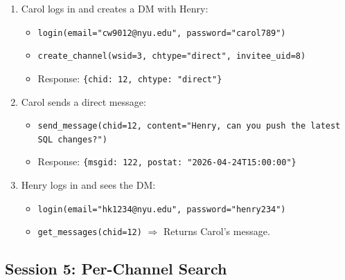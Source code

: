\documentclass[11pt]{article}
\begin{document}
\begin{enumerate}
    \item Carol logs in and creates a DM with Henry:
    \begin{itemize}
        \item \texttt{login(email="cw9012@nyu.edu", password="carol789")}
        \item \texttt{create\_channel(wsid=3, chtype="direct", invitee\_uid=8)}
        \item Response: \texttt{\{chid: 12, chtype: "direct"\}}
    \end{itemize}

    \item Carol sends a direct message:
    \begin{itemize}
        \item \texttt{send\_message(chid=12, content="Henry, can you push the latest SQL changes?")}
        \item Response: \texttt{\{msgid: 122, postat: "2026-04-24T15:00:00"\}}
    \end{itemize}

    \item Henry logs in and sees the DM:
    \begin{itemize}
        \item \texttt{login(email="hk1234@nyu.edu", password="henry234")}
        \item \texttt{get\_messages(chid=12)} $\Rightarrow$ Returns Carol's message.
    \end{itemize}
\end{enumerate}

\subsection{Session 5: Per-Channel Search}
\end{document}
